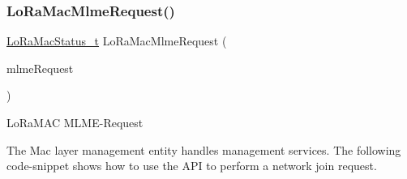 \subsubsection{\texorpdfstring{Lo\+Ra\+Mac\+Mlme\+Request()}{LoRaMacMlmeRequest()}}
{\footnotesize\ttfamily \mbox{\hyperlink{group___l_o_r_a_m_a_c_ga30bd25657e10480f8605ee951b0ecfbd}{Lo\+Ra\+Mac\+Status\+\_\+t}} Lo\+Ra\+Mac\+Mlme\+Request (\begin{DoxyParamCaption}\item[{\mbox{\hyperlink{group___l_o_r_a_m_a_c_ga5a32f5920a7a3d04435c142be7f38b19}{Mlme\+Req\+\_\+t}} $\ast$}]{mlme\+Request }\end{DoxyParamCaption})}



Lo\+Ra\+M\+AC M\+L\+M\+E-\/\+Request 

The Mac layer management entity handles management services. The following code-\/snippet shows how to use the A\+PI to perform a network join request.


